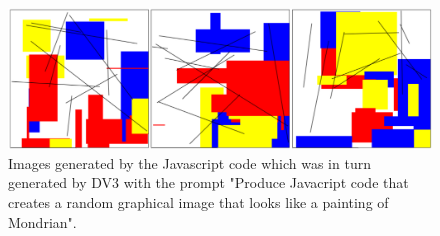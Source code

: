 \begin{figure}[ht]
	\centering
	\includegraphics[width=1\textwidth]{Section 2/Mondrian.png}
	\caption{Images generated by the Javascript code which was in turn generated by DV3 with the prompt "Produce Javacript code that creates a random graphical image that looks like a painting of Mondrian".}
	\label{fig:Mondrian}
\end{figure}


